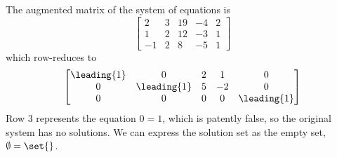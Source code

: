 The augmented matrix of the system of equations is
%
\begin{equation*}
\begin{bmatrix}
 2 & 3 & 19 & -4 & 2 \\
 1 & 2 & 12 & -3 & 1 \\
 -1 & 2 & 8 & -5 & 1
\end{bmatrix}
\end{equation*}
%
which row-reduces to
%
\begin{equation*}
\begin{bmatrix}
 \leading{1} & 0 & 2 & 1 & 0 \\
 0 & \leading{1} & 5 & -2 & 0 \\
 0 & 0 & 0 & 0 & \leading{1}
\end{bmatrix}
\end{equation*}
%
Row 3 represents the equation $0=1$, which is patently false, so the original system has no solutions.  We can express the solution set as the empty set, $\emptyset=\set{\relax}$.

